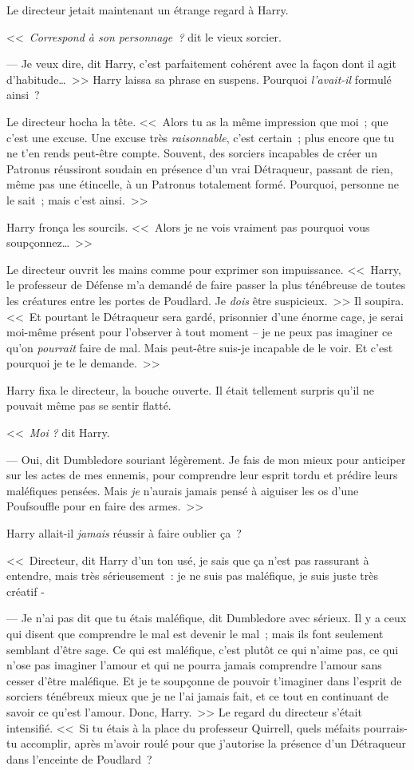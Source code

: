 Le directeur jetait maintenant un étrange regard à Harry.

<<~\emph{Correspond à son personnage~?} dit le vieux sorcier.

--- Je veux dire, dit Harry, c'est parfaitement cohérent avec la façon dont il agit d'habitude…~>> Harry laissa sa phrase en suspens. Pourquoi \emph{l'avait-il} formulé ainsi~?

Le directeur hocha la tête. <<~Alors tu as la même impression que moi~; que c'est une excuse. Une excuse très \emph{raisonnable}, c'est certain~; plus encore que tu ne t'en rends peut-être compte. Souvent, des sorciers incapables de créer un Patronus réussiront soudain en présence d'un vrai Détraqueur, passant de rien, même pas une étincelle, à un Patronus totalement formé. Pourquoi, personne ne le sait~; mais c'est ainsi.~>>

Harry fronça les sourcils. <<~Alors je ne vois vraiment pas pourquoi vous soupçonnez…~>>

Le directeur ouvrit les mains comme pour exprimer son impuissance. <<~Harry, le professeur de Défense m'a demandé de faire passer la plus ténébreuse de toutes les créatures entre les portes de Poudlard. Je \emph{dois} être suspicieux.~>> Il soupira. <<~Et pourtant le Détraqueur sera gardé, prisonnier d'une énorme cage, je serai moi-même présent pour l'observer à tout moment -- je ne peux pas imaginer ce qu'on \emph{pourrait} faire de mal. Mais peut-être suis-je incapable de le voir. Et c'est pourquoi je te le demande.~>>

Harry fixa le directeur, la bouche ouverte. Il était tellement surpris qu'il ne pouvait même pas se sentir flatté.

<<~\emph{Moi} \emph{?} dit Harry.

--- Oui, dit Dumbledore souriant légèrement. Je fais de mon mieux pour anticiper sur les actes de mes ennemis, pour comprendre leur esprit tordu et prédire leurs maléfiques pensées. Mais \emph{je} n'aurais jamais pensé à aiguiser les os d'une Poufsouffle pour en faire des armes.~>>

Harry allait-il \emph{jamais} réussir à faire oublier ça~?

<<~Directeur, dit Harry d'un ton usé, je sais que ça n'est pas rassurant à entendre, mais très sérieusement~: je ne suis pas maléfique, je suis juste très créatif -

--- Je n'ai pas dit que tu étais maléfique, dit Dumbledore avec sérieux. Il y a ceux qui disent que comprendre le mal est devenir le mal~; mais ils font seulement semblant d'être sage. Ce qui est maléfique, c'est plutôt ce qui n'aime pas, ce qui n'ose pas imaginer l'amour et qui ne pourra jamais comprendre l'amour sans cesser d'être maléfique. Et je te soupçonne de pouvoir t'imaginer dans l'esprit de sorciers ténébreux mieux que je ne l'ai jamais fait, et ce tout en continuant de savoir ce qu'est l'amour. Donc, Harry.~>> Le regard du directeur s'était intensifié. <<~Si tu étais à la place du professeur Quirrell, quels méfaits pourrais-tu accomplir, après m'avoir roulé pour que j'autorise la présence d'un Détraqueur dans l'enceinte de Poudlard~?

